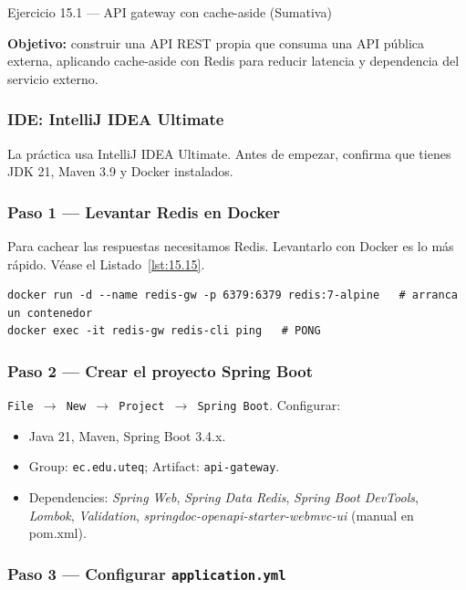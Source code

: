 \documentclass[11pt,a4paper,openany]{book}
\begin{document}
\begin{cajaejercicio}{Ejercicio 15.1 --- API gateway con cache-aside (Sumativa)}

\textbf{Objetivo:} construir una API REST propia que consuma una API
pública externa, aplicando cache-aside con Redis para reducir
latencia y dependencia del servicio externo.

\subsubsection*{IDE: IntelliJ IDEA Ultimate}

La práctica usa IntelliJ IDEA Ultimate. Antes de empezar,
confirma que tienes JDK 21, Maven 3.9 y Docker instalados.


\subsubsection*{Paso 1 --- Levantar Redis en Docker}

Para cachear las respuestas necesitamos Redis. Levantarlo
con Docker es lo más rápido. V\'ease el Listado~\ref{lst:15.15}.


\begin{lstlisting}[style=shell,numbers=none,caption={Ejemplo de Shell},label=lst:15.15]
docker run -d --name redis-gw -p 6379:6379 redis:7-alpine   # arranca un contenedor
docker exec -it redis-gw redis-cli ping   # PONG
\end{lstlisting}

\subsubsection*{Paso 2 --- Crear el proyecto Spring Boot}

\texttt{File $\rightarrow$ New $\rightarrow$ Project $\rightarrow$
Spring Boot}. Configurar:
\begin{itemize}
\item Java 21, Maven, Spring Boot 3.4.x.
\item Group: \texttt{ec.edu.uteq}; Artifact: \texttt{api-gateway}.
\item Dependencies: \emph{Spring Web}, \emph{Spring Data Redis},
\emph{Spring Boot DevTools}, \emph{Lombok}, \emph{Validation},
\emph{springdoc-openapi-starter-webmvc-ui} (manual en pom.xml).
\end{itemize}

\subsubsection*{Paso 3 --- Configurar \texttt{application.yml}}


\end{cajaejercicio}
\end{document}
